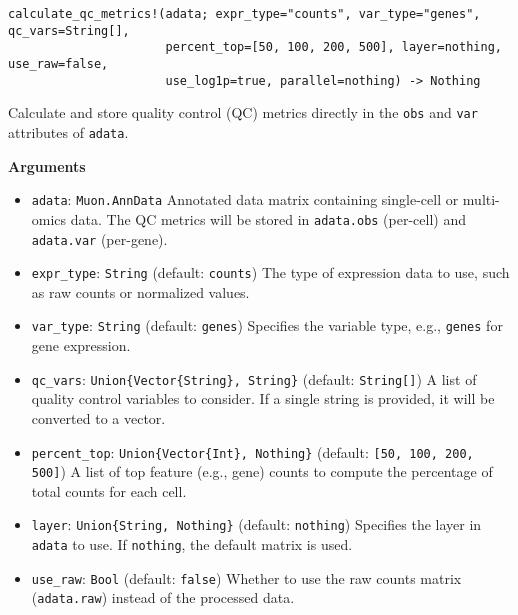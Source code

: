 \documentclass[oneside]{memoir}
\begin{document}
\begin{adjustwidth}{2em}{0pt}


\begin{verbatim}
calculate_qc_metrics!(adata; expr_type="counts", var_type="genes", qc_vars=String[], 
                      percent_top=[50, 100, 200, 500], layer=nothing, use_raw=false, 
                      use_log1p=true, parallel=nothing) -> Nothing
\end{verbatim}

Calculate and store quality control (QC) metrics directly in the \texttt{obs} and \texttt{var} attributes of \texttt{adata}.

\textbf{Arguments}

\begin{itemize}
\item \texttt{adata}: \texttt{Muon.AnnData}   Annotated data matrix containing single-cell or multi-omics data.   The QC metrics will be stored in \texttt{adata.obs} (per-cell) and \texttt{adata.var} (per-gene).


\item \texttt{expr\_type}: \texttt{String} (default: \texttt{{\textquotedbl}counts{\textquotedbl}})   The type of expression data to use, such as raw counts or normalized values.


\item \texttt{var\_type}: \texttt{String} (default: \texttt{{\textquotedbl}genes{\textquotedbl}})   Specifies the variable type, e.g., \texttt{{\textquotedbl}genes{\textquotedbl}} for gene expression.


\item \texttt{qc\_vars}: \texttt{Union\{Vector\{String\}, String\}} (default: \texttt{String[]})   A list of quality control variables to consider. If a single string is provided, it will be converted to a vector.


\item \texttt{percent\_top}: \texttt{Union\{Vector\{Int\}, Nothing\}} (default: \texttt{[50, 100, 200, 500]})   A list of top feature (e.g., gene) counts to compute the percentage of total counts for each cell.


\item \texttt{layer}: \texttt{Union\{String, Nothing\}} (default: \texttt{nothing})   Specifies the layer in \texttt{adata} to use. If \texttt{nothing}, the default matrix is used.


\item \texttt{use\_raw}: \texttt{Bool} (default: \texttt{false})   Whether to use the raw counts matrix (\texttt{adata.raw}) instead of the processed data.



\end{itemize}
\end{adjustwidth}
\end{document}
